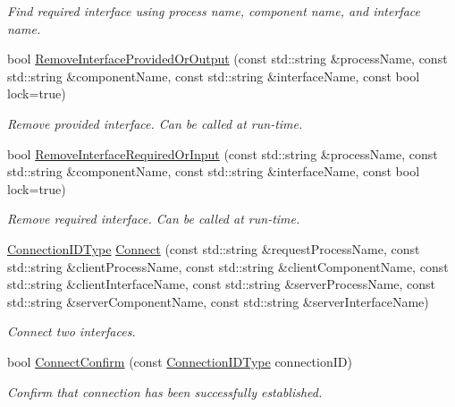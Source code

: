 \begin{DoxyCompactItemize}
\begin{DoxyCompactList}\small\item\em Find required interface using process name, component name, and interface name. \end{DoxyCompactList}\item 
bool \hyperlink{classmts_manager_global_ad997f307343ff4fb5533d2c6ba57596f}{Remove\-Interface\-Provided\-Or\-Output} (const std\-::string \&process\-Name, const std\-::string \&component\-Name, const std\-::string \&interface\-Name, const bool lock=true)
\begin{DoxyCompactList}\small\item\em Remove provided interface. Can be called at run-\/time. \end{DoxyCompactList}\item 
bool \hyperlink{classmts_manager_global_ae6f2ebe45dbea3f0a31b262398fc0907}{Remove\-Interface\-Required\-Or\-Input} (const std\-::string \&process\-Name, const std\-::string \&component\-Name, const std\-::string \&interface\-Name, const bool lock=true)
\begin{DoxyCompactList}\small\item\em Remove required interface. Can be called at run-\/time. \end{DoxyCompactList}\item 
\hyperlink{mts_forward_declarations_8h_ad3543bb11742e1766374ec96016d6547}{Connection\-I\-D\-Type} \hyperlink{classmts_manager_global_a69bc5cdc48aec855dadf46468312d7af}{Connect} (const std\-::string \&request\-Process\-Name, const std\-::string \&client\-Process\-Name, const std\-::string \&client\-Component\-Name, const std\-::string \&client\-Interface\-Name, const std\-::string \&server\-Process\-Name, const std\-::string \&server\-Component\-Name, const std\-::string \&server\-Interface\-Name)
\begin{DoxyCompactList}\small\item\em Connect two interfaces. \end{DoxyCompactList}\item 
bool \hyperlink{classmts_manager_global_a2fdffc2fa545afe88283def2ea1d7c63}{Connect\-Confirm} (const \hyperlink{mts_forward_declarations_8h_ad3543bb11742e1766374ec96016d6547}{Connection\-I\-D\-Type} connection\-I\-D)
\begin{DoxyCompactList}\small\item\em Confirm that connection has been successfully established. \end{DoxyCompactList}\item 

\end{DoxyCompactItemize}
